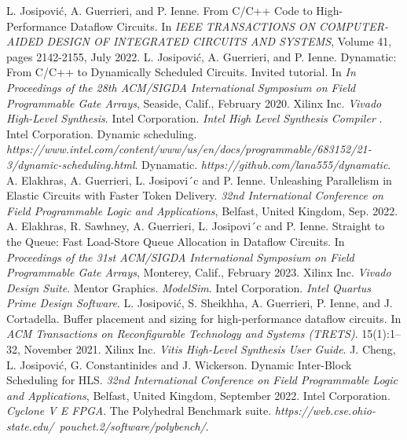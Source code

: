 \documentclass[final,5p,times,twocolumn]{elsarticle}
\begin{document}
\begin{spacing}{1.125}
\begin{thebibliography}{00}

 L. Josipović, A. Guerrieri, and P. Ienne. From C/C++ Code to High-Performance Dataflow Circuits. In \textit{IEEE TRANSACTIONS ON COMPUTER-AIDED DESIGN OF INTEGRATED CIRCUITS AND SYSTEMS}, Volume 41, pages 2142-2155, July 2022.
 L. Josipović, A. Guerrieri, and P. Ienne. Dynamatic: From C/C++ to Dynamically Scheduled Circuits. Invited tutorial. In \textit{In Proceedings of the 28th ACM/SIGDA International Symposium on Field Programmable Gate Arrays}, Seaside, Calif., February 2020.
 Xilinx Inc. \textit{Vivado High-Level Synthesis}.
 Intel Corporation. \textit{Intel High Level Synthesis Compiler }.
 Intel Corporation. Dynamic scheduling. \textit{https://www.intel.com/content/www/us/en/docs/programmable/683152/21-3/dynamic-scheduling.html}.
 Dynamatic. \textit{https://github.com/lana555/dynamatic}.
 A. Elakhras, A. Guerrieri, L. Josipovi´c and P. Ienne. Unleashing Parallelism in Elastic Circuits with Faster Token Delivery. \textit{32nd International Conference on Field Programmable Logic and Applications}, Belfast, United Kingdom, Sep. 2022.
 A. Elakhras,  R. Sawhney, A. Guerrieri, L. Josipovi´c and P. Ienne. Straight to the Queue: Fast Load-Store Queue Allocation in Dataflow Circuits. In \textit{Proceedings of the 31st ACM/SIGDA International Symposium on Field Programmable Gate Arrays}, Monterey, Calif., February 2023. 
 Xilinx Inc. \textit{Vivado Design Suite}.
 Mentor Graphics. \textit{ModelSim}.
 Intel Corporation. \textit{Intel Quartus Prime Design Software}.
 L. Josipović, S. Sheikhha, A. Guerrieri, P. Ienne, and J. Cortadella. Buffer placement and sizing for high-performance dataflow circuits. In \textit{ACM Transactions on Reconfigurable Technology and Systems (TRETS)}. 15(1):1–32, November 2021.
 Xilinx Inc. \textit{Vitis High-Level Synthesis User Guide}.
 J. Cheng, L. Josipović, G. Constantinides and J. Wickerson. Dynamic Inter-Block Scheduling for HLS. \textit{32nd International Conference on Field Programmable Logic and Applications}, Belfast, United Kingdom, September 2022.
 Intel Corporation. \textit{Cyclone V E FPGA}.
 The Polyhedral Benchmark suite. \textit{https://web.cse.ohio-state.edu/~pouchet.2/software/polybench/}.

\end{thebibliography}

\end{spacing}
\end{document}
